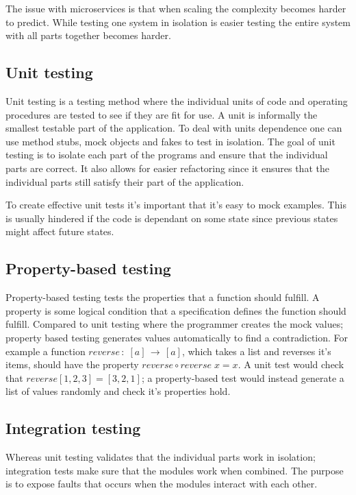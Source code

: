 The issue with microservices is that when scaling the complexity becomes harder
to predict. While testing one system in isolation is easier testing the entire
system with all parts together becomes harder. 

\subsection{Unit testing}

Unit testing is a testing method where the individual units of code and
operating procedures are tested to see if they are fit for use. A unit is
informally the smallest testable part of the application. To deal with units
dependence one can use method stubs, mock objects and fakes to test in
isolation. The goal of unit testing is to isolate each part of the programs and
ensure that the individual parts are correct. It also allows for easier
refactoring since it ensures that the individual parts still satisfy their part
of the application.

To create effective unit tests it's important that it's easy to mock examples.
This is usually hindered if the code is dependant on some state since previous
states might affect future states.

\subsection{Property-based testing}

Property-based testing tests the properties that a function should fulfill. A
property is some logical condition that a specification defines the function
should fulfill.  Compared to unit testing where the programmer creates the mock
values; property based testing generates values automatically to find a
contradiction. For example a function $reverse\, : \; [a]\, \rightarrow\, [a]$,
which takes a list and reverses it's items, should have the property
$reverse\circ reverse\; x = x$. A unit test would check that $reverse [1,2,3] =
[3,2,1]$; a property-based test would instead generate a list of values randomly
and check it's properties hold.

\subsection{Integration testing}

Whereas unit testing validates that the individual parts work in isolation;
integration tests make sure that the modules work when combined. The purpose is
to expose faults that occurs when the modules interact with each other.

